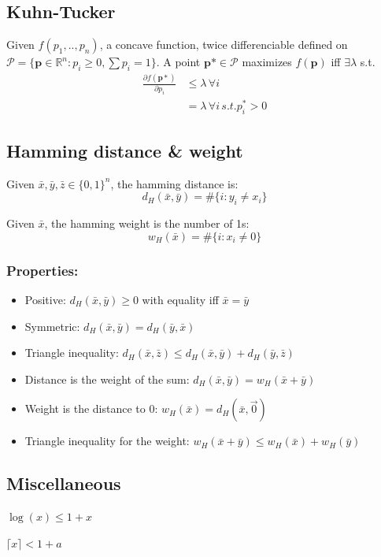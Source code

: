 \documentclass[10pt,a4paper,landscape]{article}
\begin{document}
\begin{multicols*}{4}
\subsection{Kuhn-Tucker}
Given $f(p_1,..,p_n)$, a concave function, twice differenciable defined on $\mathcal{P} = \{\boldsymbol p \in \mathbb{R}^n : p_i \geq 0, \sum p_i = 1\}$. A point $\boldsymbol p* \in \mathcal{P}$ maximizes $f(\boldsymbol p)$ iff $\exists \lambda$ s.t.
\begin{align*}
 \frac{\partial f(\boldsymbol p*)}{\partial p_i} 	& \leq \lambda \, \forall i \\
							& = \lambda \, \forall i \, s.t. p_i^* > 0
\end{align*}

\subsection{Hamming distance \& weight}
Given $\bar{x}, \bar{y}, \bar{z} \in \{0,1\}^n$, the hamming distance is:
$$d_H(\bar{x},\bar{y}) = \#\{i:y_i \neq x_i\}$$

Given $\bar x$, the hamming weight is the number of 1s:
$$w_H(\bar{x}) = \#\{i: x_i \neq 0\}$$

\subsubsection{Properties:}
\begin{itemize}
	 \item Positive: $d_H(\bar{x},\bar{y}) \geq 0$ with equality iff $\bar{x} = \bar{y}$
	 \item Symmetric: $d_H(\bar{x},\bar{y}) = d_H(\bar{y},\bar{x})$
	 \item Triangle inequality: $d_H(\bar{x},\bar{z}) \leq d_H(\bar{x},\bar{y}) + d_H(\bar{y},\bar{z})$
	 \item Distance is the weight of the sum: $d_H(\bar{x},\bar{y}) = w_H(\bar x + \bar y)$
	 \item Weight is the distance to 0:
	 $w_H(\bar x) = d_H(\bar x, \vec 0)$
	 \item Triangle inequality for the weight:
	 $w_H(\bar x + \bar y) \leq w_H(\bar x) + w_H(\bar y)$
\end{itemize}

\subsection{Miscellaneous}
$\log(x) \leq 1 + x$

$\lceil x \rceil < 1 + a$


\end{multicols*}
\end{document}
